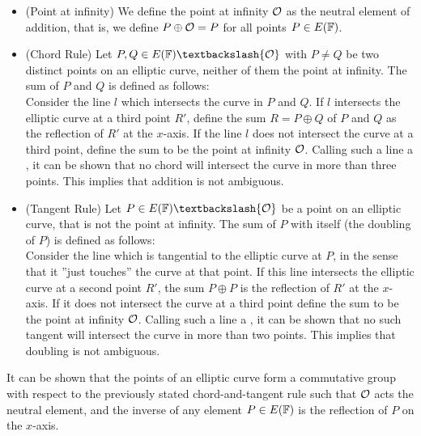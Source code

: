 \begin{itemize}
\label{def:chord-and-tangent}
\item (Point at infinity) We define the point at infinity $\mathcal{O}$ as the neutral element of addition, that is, we define $P\oplus\mathcal{O} = P$ for all points $P\in E(\mathbb{F})$.
\item (Chord Rule) Let $P, Q\in E(\F)\textbackslash \{\Oinf\}$ with $P\neq Q$ be two distinct points on an elliptic curve, neither of them the point at infinity. The sum of $P$ and $Q$ is defined as follows:\\
Consider the line $l$ which intersects the curve in $P$ and $Q$. If $l$ intersects the elliptic curve at a third point $R'$, define the sum $R=P\oplus Q$ of $P$ and $Q$ as the reflection of $R'$ at the $x$-axis. If the line $l$ does not intersect the curve at a third point, define the sum to be the point at infinity $\mathcal{O}$. Calling such a line a , it can be shown that no chord will intersect the curve in more than three points. This implies that addition is not ambiguous.
\item (Tangent Rule) Let $P \in E(\F)\textbackslash \{\Oinf\}$ be a point on an elliptic curve, that is not the point at infinity. The sum of $P$ with itself (the doubling of $P$) is defined as follows:\\
Consider the line which is tangential to the elliptic curve at $P$, in the sense that it ''just touches'' the curve at that point. If this line intersects the elliptic curve at a second point $R'$, the sum $P\oplus P$ is the reflection of $R'$ at the $x$-axis. If it does not intersect the curve at a third point define the sum to be the point at infinity $\mathcal{O}$. Calling such a line a , it can be shown that no such tangent will intersect the curve in more than two points. This implies that doubling is not ambiguous.
\end{itemize}
It can be shown that the points of an elliptic curve form a commutative group with respect to the previously stated chord-and-tangent rule such that $\mathcal{O}$ acts the neutral element, and the inverse of any element $P\in E(\mathbb{F})$ is the reflection of $P$ on the $x$-axis. 

